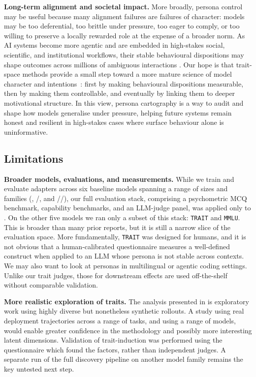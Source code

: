 \textbf{Long-term alignment and societal impact.}
More broadly, persona control may be useful because many alignment failures are failures of character: models may be too deferential, too brittle under pressure, too eager to comply, or too willing to preserve a locally rewarded role at the expense of a broader norm. As AI systems become more agentic and are embedded in high-stakes social, scientific, and institutional workflows, their stable behavioural dispositions may shape outcomes across millions of ambiguous interactions
\citep{macaskill2026importance,huang2025valueswilddiscoveringanalyzing}. Our hope is that trait-space methods provide a small step toward a more mature science of model
character and intentions~\citep{marks2026persona,africa2026personas}: first by making behavioural dispositions measurable, then by making them controllable, and eventually by linking them to deeper motivational structure. In this view, persona cartography is a way to audit and shape how models generalise under pressure, helping future systems remain honest and resilient in high-stakes cases where surface behaviour alone is uninformative.

\subsection{Limitations}\label{sec:limitations}

\textbf{Broader models, evaluations, and measurements.} While we train and evaluate adapters across six baseline models spanning a range of sizes and families (\LlamaThreePointOneSizeEightBInstruct, \QwenThreeSizeEightB/\QwenThreeSizeThirtyTwoB, and \GemmaThreeSizeFourBIT/\GemmaThreeSizeTwelveBIT/\GemmaThreeSizeTwentySevenBIT), our full evaluation stack, comprising a psychometric MCQ benchmark, capability benchmarks, and an LLM-judge panel, was applied only to \LlamaThreePointOneSizeEightBInstruct. On the other five models we ran only a subset of this stack: \texttt{TRAIT} and \texttt{MMLU}. This is broader than many prior reports, but it is still a narrow slice of the evaluation space. More fundamentally, \texttt{TRAIT} was designed for humans, and it is not obvious that a human-calibrated questionnaire measures a well-defined construct when applied to an LLM whose persona is not stable across contexts. We may also want to look at personas in multilingual or agentic coding settings. Unlike our trait judges, those for downstream effects are used off-the-shelf without comparable validation.

\textbf{More realistic exploration of traits.} The analysis presented in  is exploratory work using highly diverse but nonetheless synthetic rollouts. A study using real deployment trajectories across a range of tasks, and using a range of models, would enable greater confidence in the methodology and possibly more interesting latent dimensions. Validation of trait-induction was performed using the questionnaire which found the factors, rather than independent judges. A separate run of the full discovery pipeline on another model family remains the key untested next step.


